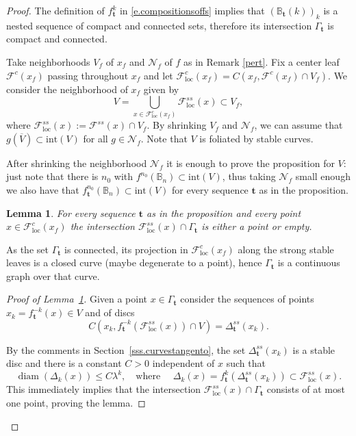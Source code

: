 \documentclass[11pt,reqno]{amsart}
\theoremstyle{plain}
\newtheorem{lemma}[theorem]{Lemma}
\newtheorem*{theorem A}{Theorem A}
\newtheorem*{theorem B}{Theorem B}
\newtheorem*{theorem C}{Theorem C}
\newtheorem*{theorem 1}{Theorem 1}
\newtheorem*{theorem 2}{Theorem 2}
\newtheorem*{theorem 3}{Theorem 3}
\DeclareMathOperator{\diam}{diam}
\numberwithin{equation}{section}
\begin{document}
\begin{proof}
The definition of $f^k_{\mathbf{t}}$ in \eqref{e.compositionsoffs} implies that $(\mathbb{B}_{\mathbf{t}} (k))_k$ is a nested sequence of compact and connected sets, therefore its intersection $\Gamma_{\mathbf{t}}$ is compact and connected.

Take neighborhoods $V_f$ of $x_f$ and $\mathcal{N}_f$ of $f$ as in Remark \ref{pert}.
Fix a center leaf $\mathcal{F}^{c}(x_f)$ passing throughout $x_f$ and let $\mathcal{F}^{c}_{\mathrm{loc}}(x_f)= C(x_f, \mathcal{F}^{c}(x_f)\cap V_f)$.
We consider the neighborhood of $x_f$ given by
\begin{equation}\label{v0}
V=\bigcup_{x \in \mathcal{F}^{c}_{\mathrm{loc}}(x_f)} \mathcal{F}^{ss}_{\mathrm{loc}}(x) \subset V_f,
\end{equation}
where $\mathcal{F}^{ss}_{\mathrm{loc}}(x):=\mathcal{F}^{ss}(x)\cap V_f$.
By shrinking $V_f$ and $\mathcal{N}_f$, we can assume that $g(\overline{V}) \subset \mathrm{int} (V)$ for all $g\in \mathcal{N}_f$.
Note that $V$ is foliated by stable curves.

After shrinking the neighborhood $\mathcal{N}_f$ it is enough to prove the proposition for $V$: just note that there is $n_0$ with $f^{n_0} (\mathbb{B}_n) \subset \mathrm{int}(V)$, thus taking $\mathcal{N}_f$ small enough we also have that $f_{\mathbf{t}}^{n_0} (\mathbb{B}_n) \subset \mathrm{int}(V)$ for every sequence $\mathbf{t}$ as in the proposition.

\begin{lemma}\label{l.atmostapoint}
For every sequence $\mathbf{t}$ as in the proposition and every point $x \in \mathcal{F}^{c}_{\mathrm{loc}}(x_f)$ the intersection $\mathcal{F}^{ss}_{\mathrm{loc}}(x) \cap \Gamma_{\mathbf{t}}$ is either a point or empty.
\end{lemma}
As the set $\Gamma_{\mathbf{t}}$ is connected, its projection in $\mathcal{F}^{c}_{\mathrm{loc}}(x_f)$ along the strong stable leaves is a closed curve (maybe degenerate to a point), hence $\Gamma_{\mathbf{t}}$ is a continuous graph over that curve.

\begin{proof}[Proof of Lemma~\ref{l.atmostapoint}]
Given a point $x\in \Gamma_{\mathbf{t}}$ consider the sequences of points $x_k = f_{\mathbf{t}}^{-k}(x) \in V$ and of discs
$$
C(x_k, f_{\textbf{t}}^{-k}(\mathcal{F}^{ss}_{\mathrm{loc}}(x))\cap V) = \Delta^{ss}_{\mathbf{t}} (x_k).
$$

By the comments in Section~\ref{sss.curvestangento}, the set $\Delta^{ss}_{\mathbf{t}} (x_k)$ is a stable disc and there is a constant $C>0$ independent of $x$ such that
$$
\diam (\Delta_k(x)) \le C \lambda^k, \quad \mbox{where } \quad \Delta_k(x)= f_{\textbf{t}}^{k} (\Delta^{ss}_{\mathbf{t}} (x_k))\subset \mathcal{F}^{ss}_{\mathrm{loc}}(x).
$$
This immediately implies that the intersection $\mathcal{F}^{ss}_{\mathrm{loc}} (x)\cap \Gamma_{\mathbf{t}}$ consists of at most one point, proving the lemma.
\end{proof}


\end{proof}
\end{document}
